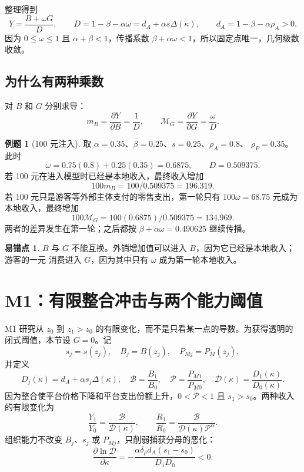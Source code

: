 \documentclass[UTF8,11pt,scheme=chinese,fontset=fandol]{ctexart}
\newcommand{\calB}{\mathcal B}
\newcommand{\calD}{\mathcal D}
\newcommand{\calP}{\mathcal P}
\newcommand{\MG}{\mathcal M_G}
\theoremstyle{definition}
\newtheorem{workedexample}{例题}[section]
\newtheorem{commonerror}{易错点}[section]
\begin{document}
整理得到
\[
Y=\frac{B+\omega G}{D},
\qquad
D=1-\beta-\alpha\omega
=d_A+\alpha s\Delta(\kappa),
\qquad
d_A=1-\beta-\alpha\rho_A>0.
\]
因为 \(0\leq\omega\leq1\) 且 \(\alpha+\beta<1\)，传播系数
\(\beta+\alpha\omega<1\)，所以固定点唯一，几何级数收敛。

\subsection{为什么有两种乘数}

对 \(B\) 和 \(G\) 分别求导：
\[
\boxed{
m_B=\frac{\partial Y}{\partial B}=\frac1D,
\qquad
\MG=\frac{\partial Y}{\partial G}=\frac{\omega}{D}.}
\]

\begin{workedexample}[100 元注入]
取 \(\alpha=0.35\)、\(\beta=0.25\)、\(s=0.25\)、\(\rho_A=0.8\)、
\(\rho_P=0.35\)。此时
\[
\omega=0.75(0.8)+0.25(0.35)=0.6875,
\qquad D=0.509375.
\]
若 100 元在进入模型时已经是本地收入，最终收入增加
\[
100m_B=100/0.509375=196.319.
\]
若 100 元只是游客等外部主体支付的零售支出，第一轮只有
\(100\omega=68.75\) 元成为本地收入，最终增加
\[
100\MG=100(0.6875)/0.509375=134.969.
\]
两者的差异发生在第一轮；之后都按 \(\beta+\alpha\omega=0.490625\) 继续传播。
\end{workedexample}

\begin{commonerror}
\(B\) 与 \(G\) 不能互换。外销增加值可以进入 \(B\)，因为它已经是本地收入；游客的一元
消费进入 \(G\)，因为其中只有 \(\omega\) 成为第一轮本地收入。
\end{commonerror}

\section{M1：有限整合冲击与两个能力阈值}

M1 研究从 \(z_0\) 到 \(z_1>z_0\) 的有限变化，而不是只看某一点的导数。为获得透明的
闭式阈值，本节设 \(G=0\)。记
\[
s_j=s(z_j),\quad B_j=B(z_j),\quad P_{Mj}=P_M(z_j),
\]
并定义
\[
D_j(\kappa)=d_A+\alpha s_j\Delta(\kappa),
\quad
\calB=\frac{B_1}{B_0},
\quad
\calP=\frac{P_{M1}}{P_{M0}},
\quad
\calD(\kappa)=\frac{D_1(\kappa)}{D_0(\kappa)}.
\]
因为整合使平台价格下降和平台支出份额上升，\(0<\calP<1\) 且 \(s_1>s_0\)。两种收入
的有限变化为
\[
\boxed{
\frac{Y_1}{Y_0}=\frac{\calB}{\calD(\kappa)},
\qquad
\frac{R_1}{R_0}=\frac{\calB}
{\calD(\kappa)\calP^\alpha}.}
\]
组织能力不改变 \(B_j\)、\(s_j\) 或 \(P_{Mj}\)，只削弱捕获分母的恶化：
\[
\frac{\partial\ln\calD}{\partial\kappa}
=-\frac{\alpha\delta_\rho d_A(s_1-s_0)}{D_1D_0}<0.
\]
\end{document}
